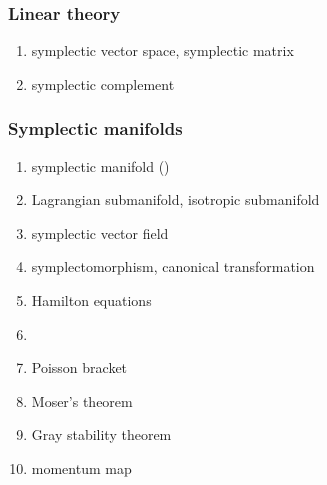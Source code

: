 \documentclass[12pt]{article}
\begin{document}
\subsubsection*{Linear theory}
\begin{enumerate}
\item symplectic vector space, symplectic matrix
\item symplectic complement
\end{enumerate}

\subsubsection*{Symplectic manifolds}
\begin{enumerate}
\item symplectic manifold ()
\item Lagrangian submanifold, isotropic submanifold
\item symplectic vector field
\item symplectomorphism, canonical transformation
\item Hamilton equations
\item {}
\item Poisson bracket
\item Moser's theorem
\item Gray stability theorem
\item momentum map
\end{enumerate}
\end{document}
